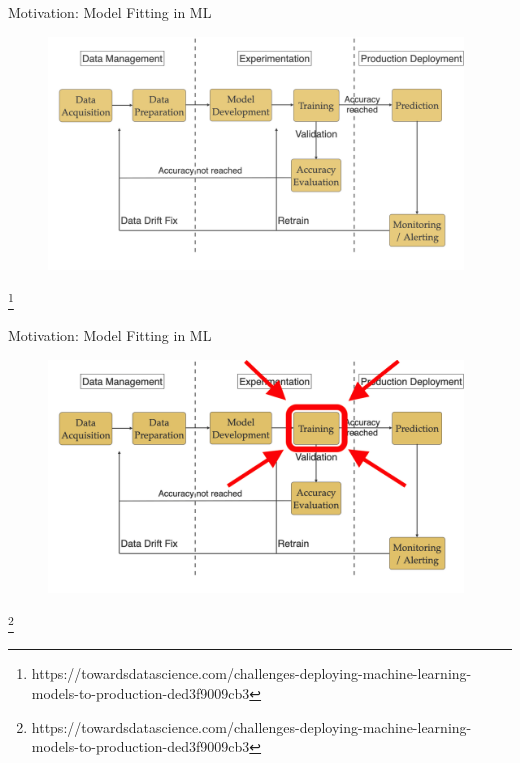 \documentclass[mathserif,notheorems, hyperref={colorlinks, urlcolor=blue, linkcolor=blue}]{beamer}
\newcommand{\source}[1]{{\let\thefootnote\relax\footnote{{\tiny #1}}}}
\begin{document}
    \begin{frame}{Motivation: Model Fitting in ML}
       
       \begin{figure}
            \centering
            \includegraphics[width=0.98\textwidth]{figures/workflow} 
       \end{figure} 

       \source{https://towardsdatascience.com/challenges-deploying-machine-learning-models-to-production-ded3f9009cb3}
    \end{frame}

    \begin{frame}{Motivation: Model Fitting in ML}
       
       \begin{figure}
            \centering
            \includegraphics[width=0.98\textwidth]{figures/workflow_highlighted} 
       \end{figure} 

       \source{https://towardsdatascience.com/challenges-deploying-machine-learning-models-to-production-ded3f9009cb3}
    \end{frame}
    
\end{document}
